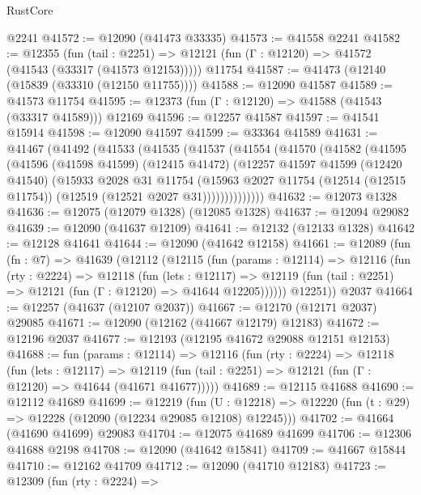 \begin{lexlean}{RustCore}
\begin{coremodule}
    @2241
@41572 := @12090 (@41473 @33335)
@41573 := @41558 @2241
@41582 := @12355
    (fun (tail : @2251) => @12121 (fun (Γ : @12120) => @41572 (@41543 (@33317 (@41573 @12153)))))
    @11754
@41587 := @41473 (@12140 (@15839 (@33310 (@12150 @11755))))
@41588 := @12090 @41587
@41589 := @41573 @11754
@41595 := @12373 (fun (Γ : @12120) => @41588 (@41543 (@33317 @41589))) @12169
@41596 := @12257 @41587
@41597 := @41541 @15914
@41598 := @12090 @41597
@41599 := @33364 @41589
@41631 := @41467
    (@41492
      (@41533
        (@41535
          (@41537
            (@41554
              (@41570
                (@41582
                  (@41595
                    (@41596
                      (@41598 @41599)
                      (@12415 @41472)
                      (@12257
                        @41597
                        @41599
                        (@12420 @41540)
                        (@15933
                          @2028
                          @31
                          @11754
                          (@15963
                            @2027
                            @11754
                            (@12514 (@12515 @11754))
                            (@12519 (@12521 @2027 @31))))))))))))))
@41632 := @12073 @1328
@41636 := @12075 (@12079 @1328) (@12085 @1328)
@41637 := @12094 @29082
@41639 := @12090 (@41637 @12109)
@41641 := @12132 (@12133 @1328)
@41642 := @12128 @41641
@41644 := @12090 (@41642 @12158)
@41661 := @12089
    (fun (fn : @7) =>
    @41639
      (@12112
        (@12115
          (fun (params : @12114) =>
          @12116
            (fun (rty : @2224) =>
            @12118
              (fun (lets : @12117) =>
              @12119 (fun (tail : @2251) => @12121 (fun (Γ : @12120) => @41644 @12205))))))
        @12251))
    @2037
@41664 := @12257 (@41637 (@12107 @2037))
@41667 := @12170 (@12171 @2037) @29085
@41671 := @12090 (@12162 (@41667 @12179) @12183)
@41672 := @12196 @2037
@41677 := @12193 (@12195 @41672 @29088 @12151 @12153)
@41688 := fun (params : @12114) =>
  @12116
    (fun (rty : @2224) =>
    @12118
      (fun (lets : @12117) =>
      @12119 (fun (tail : @2251) => @12121 (fun (Γ : @12120) => @41644 (@41671 @41677)))))
@41689 := @12115 @41688
@41690 := @12112 @41689
@41699 := @12219
    (fun (U : @12218) => @12220 (fun (t : @29) => @12228 (@12090 (@12234 @29085 @12108) @12245)))
@41702 := @41664 (@41690 @41699) @29083
@41704 := @12075 @41689 @41699
@41706 := @12306 @41688 @2198
@41708 := @12090 (@41642 @15841)
@41709 := @41667 @15844
@41710 := @12162 @41709
@41712 := @12090 (@41710 @12183)
@41723 := @12309
    (fun (rty : @2224) =>

\end{coremodule}
\end{lexlean}
